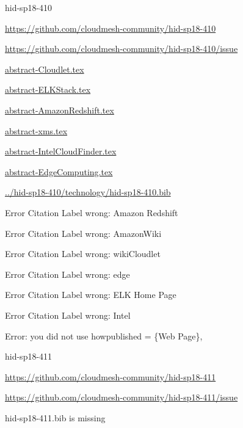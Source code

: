 \begin{IU}

hid-sp18-410

\url{https://github.com/cloudmesh-community/hid-sp18-410}

\url{https://github.com/cloudmesh-community/hid-sp18-410/issue}

\href{https://github.com/cloudmesh-community/hid-sp18-410/blob/master//technology/abstract-Cloudlet.tex}{abstract-Cloudlet.tex}

\href{https://github.com/cloudmesh-community/hid-sp18-410/blob/master//technology/abstract-ELKStack.tex}{abstract-ELKStack.tex}

\href{https://github.com/cloudmesh-community/hid-sp18-410/blob/master//technology/abstract-AmazonRedshift.tex}{abstract-AmazonRedshift.tex}

\href{https://github.com/cloudmesh-community/hid-sp18-410/blob/master//technology/abstract-xms.tex}{abstract-xms.tex}

\href{https://github.com/cloudmesh-community/hid-sp18-410/blob/master//technology/abstract-IntelCloudFinder.tex}{abstract-IntelCloudFinder.tex}

\href{https://github.com/cloudmesh-community/hid-sp18-410/blob/master//technology/abstract-EdgeComputing.tex}{abstract-EdgeComputing.tex}

\href{https://github.com/cloudmesh-community/hid-sp18-410/blob/master//technology/hid-sp18-410.bib}{../hid-sp18-410/technology/hid-sp18-410.bib}

 Error Citation Label wrong: Amazon Redshift

 Error Citation Label wrong: AmazonWiki

 Error Citation Label wrong: wikiCloudlet

 Error Citation Label wrong: edge

 Error Citation Label wrong: ELK Home Page

 Error Citation Label wrong: Intel

Error: you did not use howpublished = \{Web Page\},

\end{IU}


\begin{IU}

hid-sp18-411

\url{https://github.com/cloudmesh-community/hid-sp18-411}

\url{https://github.com/cloudmesh-community/hid-sp18-411/issue}

hid-sp18-411.bib is missing

\end{IU}


